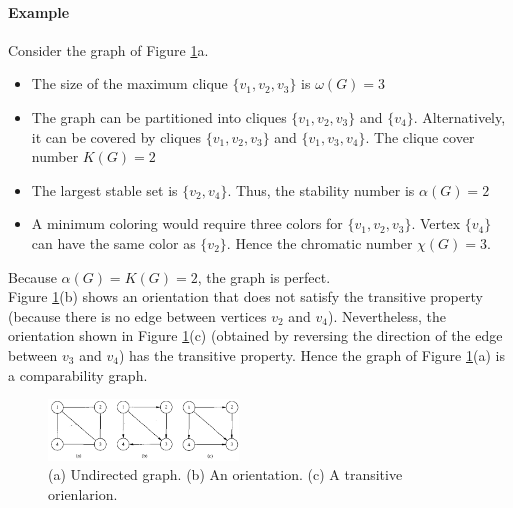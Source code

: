 \paragraph{Example}
Consider the graph of Figure \ref{fig:Undirec}a.
\begin{itemize}
\item The size of the maximum clique $ \lbrace v_1,v_2,v_3 \rbrace $ is $ \omega(G)=3 $
\item The graph can be partitioned into cliques $ \lbrace v_1,v_2,v_3 \rbrace $ and $ \lbrace v_4 \rbrace $.  Alternatively,  it  can be covered by cliques $ \lbrace v_1,v_2,v_3 \rbrace $ and $ \lbrace v_1,v_3,v_4 \rbrace $. The clique cover number $ K(G) = 2$
\item  The largest stable set is  $ \lbrace v_2,v_4 \rbrace $.  Thus, the stability number is $ \alpha(G) = 2$ 
\item  A  minimum coloring would require three colors for $ \lbrace v_1,v_2,v_3 \rbrace $. Vertex $ \lbrace v_4 \rbrace $ can have the same color as $ \lbrace v_2 \rbrace $.  Hence the chromatic number $ \chi(G)=3$.
\end{itemize}
Because $ \alpha(G) = K(G) = 2 $, the graph is perfect.\\
Figure \ref{fig:Undirec}(b) shows an orientation that does not satisfy the transitive property (because there is no edge between vertices $ v_2 $  and  $ v_4 $).  Nevertheless, the orientation shown in Figure  \ref{fig:Undirec}(c) (obtained by reversing the direction of the edge between $ v_3 $  and  $ v_4 $)  has the transitive property. Hence the graph of Figure  \ref{fig:Undirec}(a) is a comparability graph.
\begin{figure}[H]
    \centering
    \includegraphics[width=0.45\textwidth]{./Cap5/Images/Image04.png}
    \caption{(a)  Undirected  graph.  (b)  An  orientation.  (c)  A  transitive  orienlarion.}
    \label{fig:Undirec}
\end{figure}	



